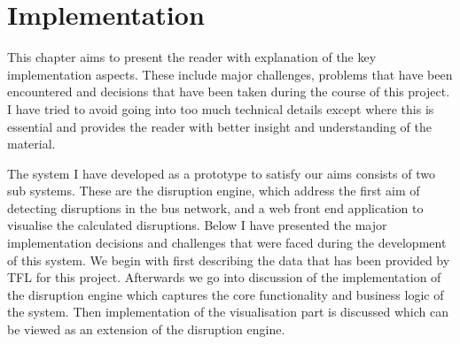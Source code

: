 \chapter{Implementation}
This chapter aims to present the reader with explanation of the key implementation aspects. These include major challenges, problems that have been encountered and decisions that have been taken during the course of this project. I have tried to avoid going into too much technical details except where this is essential and provides the reader with better insight and understanding of the material.

The system I have developed as a prototype to satisfy our aims consists of two sub systems. These are the disruption engine, which address the first aim of detecting disruptions in the bus network, and a web front end application to visualise the calculated disruptions. Below I have presented the major implementation decisions and challenges that were faced during the development of this system. We begin with first describing the data that has been provided by TFL for this project. Afterwards we go into discussion of the implementation of the disruption engine which captures the core functionality and business logic of the system. Then implementation of the visualisation part is discussed which can be viewed as an extension of the disruption engine.

